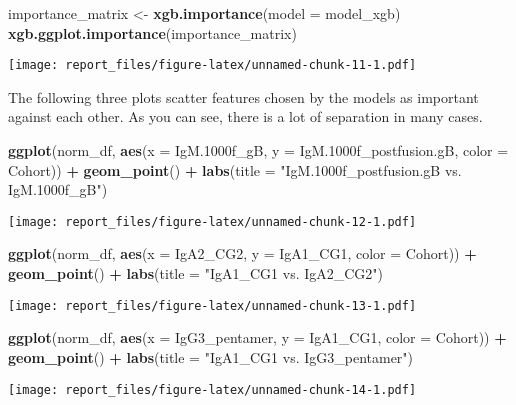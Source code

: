 \documentclass[]{article}
\newenvironment{Shaded}{\begin{snugshade}}{\end{snugshade}}
\newcommand{\KeywordTok}[1]{\textcolor[rgb]{0.13,0.29,0.53}{\textbf{#1}}}
\newcommand{\DataTypeTok}[1]{\textcolor[rgb]{0.13,0.29,0.53}{#1}}
\newcommand{\StringTok}[1]{\textcolor[rgb]{0.31,0.60,0.02}{#1}}
\newcommand{\OperatorTok}[1]{\textcolor[rgb]{0.81,0.36,0.00}{\textbf{#1}}}
\newcommand{\NormalTok}[1]{#1}
\begin{document}
\begin{Shaded}
\begin{Highlighting}[]
\NormalTok{importance_matrix <-}\StringTok{ }\KeywordTok{xgb.importance}\NormalTok{(}\DataTypeTok{model =}\NormalTok{ model_xgb)}
\KeywordTok{xgb.ggplot.importance}\NormalTok{(importance_matrix)}
\end{Highlighting}
\end{Shaded}

\texttt{[image: report\_files/figure-latex/unnamed-chunk-11-1.pdf]}

The following three plots scatter features chosen by the models as
important against each other. As you can see, there is a lot of
separation in many cases.

\begin{Shaded}
\begin{Highlighting}[]
\KeywordTok{ggplot}\NormalTok{(norm_df, }\KeywordTok{aes}\NormalTok{(}\DataTypeTok{x =}\NormalTok{ IgM.1000f_gB, }\DataTypeTok{y =}\NormalTok{ IgM.1000f_postfusion.gB, }\DataTypeTok{color =}\NormalTok{ Cohort)) }\OperatorTok{+}
\StringTok{  }\KeywordTok{geom_point}\NormalTok{() }\OperatorTok{+}
\StringTok{  }\KeywordTok{labs}\NormalTok{(}\DataTypeTok{title =} \StringTok{"IgM.1000f_postfusion.gB vs. IgM.1000f_gB"}\NormalTok{)}
\end{Highlighting}
\end{Shaded}

\texttt{[image: report\_files/figure-latex/unnamed-chunk-12-1.pdf]}

\begin{Shaded}
\begin{Highlighting}[]
\KeywordTok{ggplot}\NormalTok{(norm_df, }\KeywordTok{aes}\NormalTok{(}\DataTypeTok{x =}\NormalTok{ IgA2_CG2, }\DataTypeTok{y =}\NormalTok{ IgA1_CG1, }\DataTypeTok{color =}\NormalTok{ Cohort)) }\OperatorTok{+}
\StringTok{  }\KeywordTok{geom_point}\NormalTok{() }\OperatorTok{+}
\StringTok{  }\KeywordTok{labs}\NormalTok{(}\DataTypeTok{title =} \StringTok{"IgA1_CG1 vs. IgA2_CG2"}\NormalTok{)}
\end{Highlighting}
\end{Shaded}

\texttt{[image: report\_files/figure-latex/unnamed-chunk-13-1.pdf]}

\begin{Shaded}
\begin{Highlighting}[]
\KeywordTok{ggplot}\NormalTok{(norm_df, }\KeywordTok{aes}\NormalTok{(}\DataTypeTok{x =}\NormalTok{ IgG3_pentamer, }\DataTypeTok{y =}\NormalTok{ IgA1_CG1, }\DataTypeTok{color =}\NormalTok{ Cohort)) }\OperatorTok{+}
\StringTok{  }\KeywordTok{geom_point}\NormalTok{() }\OperatorTok{+}
\StringTok{  }\KeywordTok{labs}\NormalTok{(}\DataTypeTok{title =} \StringTok{"IgA1_CG1 vs. IgG3_pentamer"}\NormalTok{)}
\end{Highlighting}
\end{Shaded}

\texttt{[image: report\_files/figure-latex/unnamed-chunk-14-1.pdf]}
\end{document}
